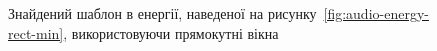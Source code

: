 \begin{figure}[h]

                \caption{Знайдений шаблон в енергії, наведеної на рисунку~\ref{fig:audio-energy-rect-min},
                    використовуючи прямокутні вікна}
                \label{fig:matched-energy-rect-min-rect}
            \end{figure}

